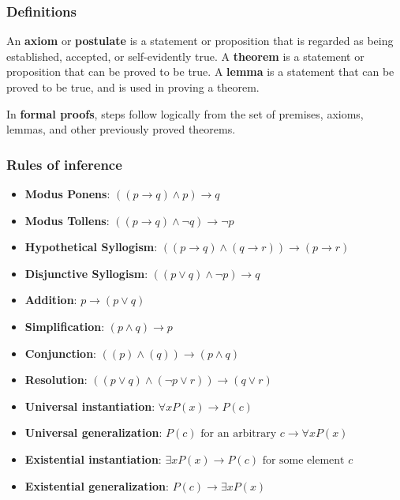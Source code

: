 \documentclass[a4paper,12pt]{article}
\begin{document}
\subsubsection{Definitions}

An \textbf{axiom} or \textbf{postulate} is a statement or proposition that is regarded as being established, accepted, or self-evidently true.
A \textbf{theorem} is a statement or proposition that can be proved to be true.
A \textbf{lemma} is a statement that can be proved to be true, and is used in proving a theorem.

In \textbf{formal proofs}, steps follow logically from the set of premises, axioms, lemmas, and other previously proved theorems.

\subsubsection{Rules of inference}

\begin{itemize}
	\item \textbf{Modus Ponens}: $((p \rightarrow q) \wedge p) \rightarrow q$
	\item \textbf{Modus Tollens}: $((p \rightarrow q) \wedge \neg q) \rightarrow \neg p$
	\item \textbf{Hypothetical Syllogism}: $((p \rightarrow q) \wedge (q \rightarrow r)) \rightarrow (p \rightarrow r)$
	\item \textbf{Disjunctive Syllogism}: $((p \vee q) \wedge \neg p) \rightarrow q$
	\item \textbf{Addition}: $p \rightarrow (p \vee q)$
	\item \textbf{Simplification}: $(p \wedge q) \rightarrow p$
	\item \textbf{Conjunction}: $((p) \wedge (q)) \rightarrow (p \wedge q)$
	\item \textbf{Resolution}: $((p \vee q) \wedge (\neg p \vee r)) \rightarrow (q \vee r)$
	\item \textbf{Universal instantiation}: $\forall x P(x) \rightarrow P(c)$
	\item \textbf{Universal generalization}: $P(c) \text{ for an arbitrary } c\rightarrow \forall x P(x)$
	\item \textbf{Existential instantiation}: $\exists x P(x) \rightarrow P(c) \text{ for some element } c$
	\item \textbf{Existential generalization}: $P(c) \rightarrow \exists x P(x)$
\end{itemize}
\end{document}

